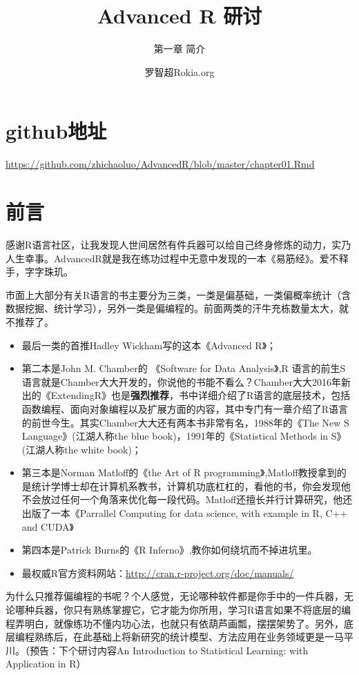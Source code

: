 \documentclass[]{article}
\title{Advanced R 研讨}
\subtitle{第一章 简介}
\author{罗智超Rokia.org}
\date{}
\begin{document}
\maketitle

{
\setcounter{tocdepth}{2}
\tableofcontents
}
\section{github地址}\label{github}

\url{https://github.com/zhichaoluo/AdvancedR/blob/master/chapter01.Rmd}

\section{前言}

感谢R语言社区，让我发现人世间居然有件兵器可以给自己终身修炼的动力，实乃人生幸事。AdvancedR就是我在练功过程中无意中发现的一本《易筋经》。爱不释手，字字珠玑。

市面上大部分有关R语言的书主要分为三类，一类是偏基础，一类偏概率统计（含数据挖掘、统计学习），另外一类是偏编程的。前面两类的汗牛充栋数量太大，就不推荐了。

\begin{itemize}
\item
  最后一类的首推Hadley Wickham写的这本《Advanced R》；
\item
  第二本是John M. Chamber的 《Software for Data Analysis》,R
  语言的前生S语言就是Chamber大大开发的，你说他的书能不看么？Chamber大大2016年新出的《ExtendingR》也是\textbf{强烈推荐}，书中详细介绍了R语言的底层技术，包括函数编程、面向对象编程以及扩展方面的内容，其中专门有一章介绍了R语言的前世今生。其实Chamber大大还有两本书非常有名，1988年的《The
  New S Language》(江湖人称the blue book)，1991年的《Statistical Methods
  in S》(江湖人称the white book)；
\item
  第三本是Norman Matloff的《the Art of R
  programming》,Matloff教授拿到的是统计学博士却在计算机系教书，计算机功底杠杠的，看他的书，你会发现他不会放过任何一个角落来优化每一段代码。Matloff还擅长并行计算研究，他还出版了一本《Parrallel
  Computing for data science, with example in R, C++ and CUDA》
\item
  第四本是Patrick Burns的《R Inferno》,教你如何绕坑而不掉进坑里。
\item
  最权威R官方资料网站：\url{http://cran.r-project.org/doc/manuals/}
\end{itemize}

为什么只推荐偏编程的书呢？个人感觉，无论哪种软件都是你手中的一件兵器，无论哪种兵器，你只有熟练掌握它，它才能为你所用，学习R语言如果不将底层的编程弄明白，就像练功不懂内功心法，也就只有依葫芦画瓢，摆摆架势了。另外，底层编程熟练后，在此基础上将新研究的统计模型、方法应用在业务领域更是一马平川。（预告：下个研讨内容An
Introduction to Statistical Learning: with Application in R）
\end{document}
